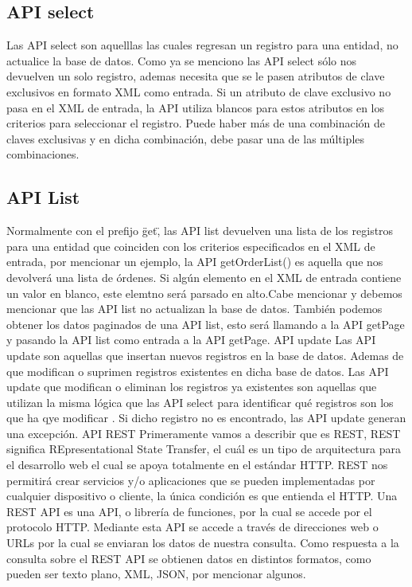   \subsection{API select}
    Las API select son aquelllas las cuales regresan un registro para una entidad, no actualice la base de datos. Como ya se menciono las API select sólo nos devuelven un solo registro, ademas necesita que se le pasen atributos de clave exclusivos en formato XML como entrada. Si un atributo de clave exclusivo no pasa en el XML de entrada, la API utiliza blancos para estos atributos en los criterios para seleccionar el registro. Puede haber más de una combinación de claves exclusivas y en dicha combinación, debe pasar una de las múltiples combinaciones. 

  \subsection{API List}
    Normalmente con el prefijo \"get\", las API list devuelven una lista de los registros para una entidad que coinciden con los criterios especificados en el XML de entrada, por mencionar un ejemplo, la API getOrderList() es aquella que nos devolverá una lista de órdenes. Si algún elemento en el XML de entrada contiene un valor en blanco, este elemtno será parsado en alto.Cabe mencionar y debemos mencionar que las API list no actualizan la base de datos. También podemos obtener los datos paginados de una API list, esto será llamando a la API getPage y pasando la API list como entrada a la API getPage. API update Las API update son aquellas que insertan nuevos registros en la base de datos. Ademas de que modifican o suprimen registros existentes en dicha base de datos. Las API update que modifican o eliminan los registros ya existentes son aquellas que utilizan la misma lógica que las API select para identificar qué registros son los que ha qye modificar . Si dicho registro no es encontrado, las API update generan una excepción. API REST Primeramente vamos a describir que es REST, REST significa REpresentational State Transfer, el cuál es un tipo de arquitectura para el desarrollo web el cual se apoya totalmente en el estándar HTTP. REST nos permitirá crear servicios y/o aplicaciones que se pueden implementadas por cualquier dispositivo o cliente, la única condición es que entienda el HTTP. Una REST API es una API, o librería de funciones, por la cual se accede por el protocolo HTTP. Mediante esta API se accede a través de direcciones web o URLs por la cual se enviaran los datos de nuestra consulta. Como respuesta a la consulta sobre el REST API se obtienen datos en distintos formatos, como pueden ser texto plano, XML, JSON, por mencionar algunos. 

